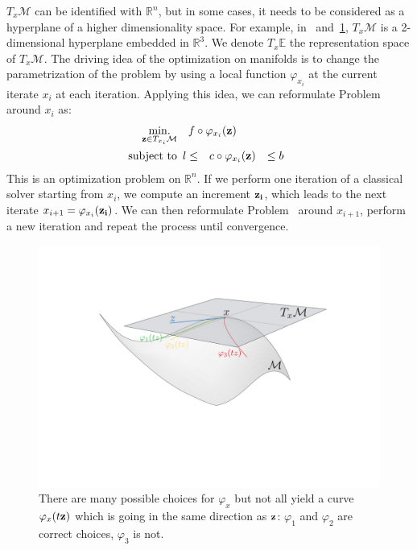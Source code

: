$T_x\mathcal{M}$ can be identified with $\mathbb{R}^n$, but in some cases, it needs to be considered as a hyperplane of a higher dimensionality space.
For example, in~ and~\ref{fig:phimap}, $T_x\mathcal{M}$ is a 2-dimensional hyperplane embedded in $\mathbb{R}^3$.
We denote $T_x\mathbb{E}$ the representation space of $T_x\mathcal{M}$.
The driving idea of the optimization on manifolds is to change the parametrization of the problem by using a local function $\varphi_{x_i}$ at the current iterate $x_i$ at each iteration.
Applying this idea, we can reformulate Problem~ around $x_i$ as:
\begin{align}
\label{eq:local_problem}
\operatorname*{min.}_{{\bf z} \in T_{x_i}\mathcal{M}} & \quad f \circ \varphi_{x_i}({\bf z}) \\
  \text{subject to}&
  \begin{array}{rcl}
    {l} \leq & c \circ \varphi_{x_i}({\bf z}) & \leq {b} \nonumber
  \end{array}
\end{align}
This is an optimization problem on $\mathbb{R}^n$.
If we perform one iteration of a classical solver starting from $x_i$, we compute an increment ${\bf z_i}$, which leads to the next iterate $x_{i+1} = \varphi_{x_i}({\bf z_i})$.
We can then reformulate Problem~ around $x_{i+1}$, perform a new iteration and repeat the process until convergence.

\begin{figure}[!htb]
  \centering
  \includegraphics[width=.9\linewidth]{Humanoids2015/manifold.pdf}
  \caption{There are many possible choices for $\varphi_{x}$ but not all yield a curve $\varphi_{x}(t{\bf z})$ which is going in the same direction as ${\bf z}$: $\varphi_{1}$ and $\varphi_{2}$ are correct choices, $\varphi_{3}$ is not.}
\label{fig:phimap}
\end{figure}

